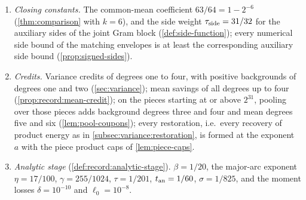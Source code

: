 \begin{definition}[Parameters]
\begin{enumerate}[label=(\alph*)]
 polarized (polarized fraction one, i.e.\ the whole of $F_{\rm fold}$ is
 subtracted in forming $\rho$; \cref{def:construction}(c)); the folded
 matching records use the
 one-stage repair of \cref{lem:record:one-stage-folded-e}, whose record
 differences, of the two types $E_0$ and $E_1$, form the two tags of (CP2)(b)
 (\cref{def:record:frame}(e)); the dominator $\Nbr$ of (CP3)
 carries one folded copy of each fold record
 (\cref{def:record:frame}(d)).
\item \emph{Closing constants.} The common-mean coefficient $63/64=1-2^{-6}$
 (\cref{thm:comparison} with $k=6$), and the side weight
 $\tau_{\mathrm{side}}=31/32$ for the auxiliary sides of the joint Gram block
 (\cref{def:side-function}); every numerical side bound of
 the matching envelopes is at least the corresponding auxiliary side
 bound (\cref{prop:signed-sides}).
\item \emph{Credits.} Variance credits of degrees one to four, with positive
 backgrounds of degrees one and two (\cref{sec:variance}); mean savings of all
 degrees up to four (\cref{prop:record:mean-credit}); on the pieces starting at
 or above $2^{31}$, pooling over those pieces adds background
 degrees three and four and mean degrees five and six
 (\cref{lem:pool-coupons}); every restoration, i.e.\ every recovery of
 product energy as in \cref{subsec:variance:restoration}, is
 formed at the exponent $a$ with the piece product caps of \cref{lem:piece-caps}.
\item \emph{Analytic stage} (\cref{def:record:analytic-stage}). $\beta=1/20$,
 the major-arc exponent $\eta=17/100$, $\gamma=255/1024$, $\tau=1/201$,
 $t_{\rm an}=1/60$, $\sigma=1/825$, and the moment losses $\delta=10^{-10}$ and
 $\ell_0=10^{-8}$.
\end{enumerate}
\end{definition}


